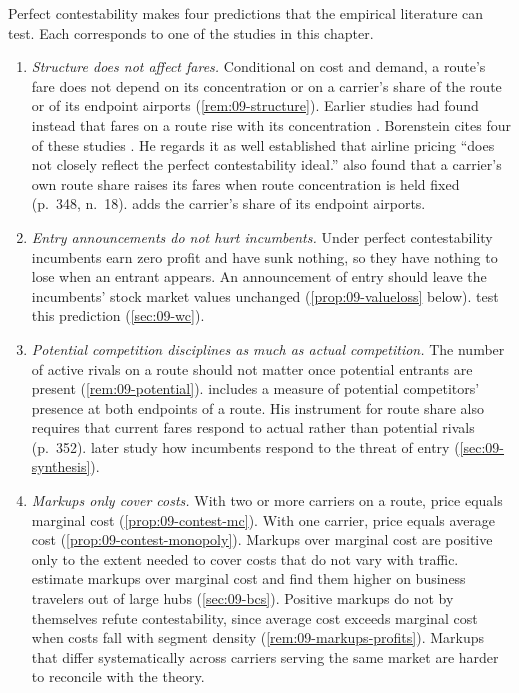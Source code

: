 Perfect contestability makes four predictions that the empirical literature can test. Each corresponds to one
of the studies in this chapter.
\begin{enumerate}[label=(C\arabic*)]
  \item \emph{Structure does not affect fares.} Conditional on cost and demand, a route's fare does not depend
  on its concentration or on a carrier's share of the route or of its endpoint airports
  (\cref{rem:09-structure}). Earlier studies had found instead that fares on a route rise with its
  concentration \citep[p.~344]{Borenstein1989}. Borenstein cites four of these studies
  \citep{GrahamKaplanSibley1983,BaileyGrahamKaplan1985,CallKeeler1985,MorrisonWinston1987}. He regards it as
  well established that airline pricing ``does not closely reflect the perfect contestability ideal.'' \citet{BaileyGrahamKaplan1985} also found that a
  carrier's own route share raises its fares when route concentration is held fixed (p.~348, n.~18).
   adds the carrier's share of its endpoint airports.
  \item \emph{Entry announcements do not hurt incumbents.} Under perfect contestability incumbents earn zero
  profit and have sunk nothing, so they have nothing to lose when an entrant appears. An announcement of entry
  should leave the incumbents' stock market values unchanged (\cref{prop:09-valueloss} below).
  \citet{WhinstonCollins1992} test this prediction (\cref{sec:09-wc}).
  \item \emph{Potential competition disciplines as much as actual competition.} The number of active rivals on
  a route should not matter once potential entrants are present (\cref{rem:09-potential}).
  \citet{Borenstein1989} includes a measure of potential competitors' presence at both endpoints of a route.
  His instrument for route share also requires that current fares respond to actual rather than potential
  rivals (p.~352). \citet{GoolsbeeSyverson2008} later study how incumbents respond to the threat of entry
  (\cref{sec:09-synthesis}).
  \item \emph{Markups only cover costs.} With two or more carriers on a route, price equals marginal cost
  (\cref{prop:09-contest-mc}). With one carrier, price equals average cost
  (\cref{prop:09-contest-monopoly}). Markups over marginal cost are positive only to the extent needed to cover
  costs that do not vary with traffic. \citet{BerryCarnallSpiller2006} estimate markups over marginal cost and
  find them higher on business travelers out of large hubs (\cref{sec:09-bcs}). Positive markups do not by
  themselves refute contestability, since average cost exceeds marginal cost when costs fall with segment
  density (\cref{rem:09-markups-profits}). Markups that differ systematically across carriers serving the same
  market are harder to reconcile with the theory.
\end{enumerate}

